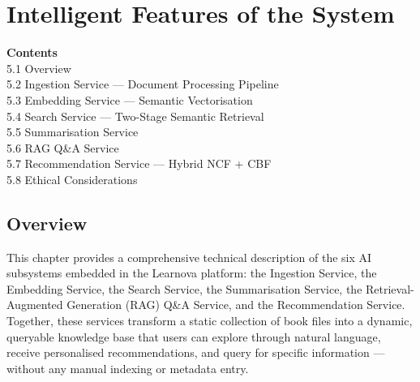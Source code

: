 \chapter{Intelligent Features of the System}

\vspace{-0.5cm}
\begin{center}
\begin{minipage}{0.85\textwidth}
\small
\textbf{Contents}\\[0.3cm]
\hspace*{1cm} 5.1 \quad Overview \dotfill \pageref{sec:ch5overview}\\
\hspace*{1cm} 5.2 \quad Ingestion Service --- Document Processing Pipeline \dotfill \pageref{sec:ingestion}\\
\hspace*{1cm} 5.3 \quad Embedding Service --- Semantic Vectorisation \dotfill \pageref{sec:embedding}\\
\hspace*{1cm} 5.4 \quad Search Service --- Two-Stage Semantic Retrieval \dotfill \pageref{sec:search}\\
\hspace*{1cm} 5.5 \quad Summarisation Service \dotfill \pageref{sec:summarisation}\\
\hspace*{1cm} 5.6 \quad RAG Q\&A Service \dotfill \pageref{sec:ragservice}\\
\hspace*{1cm} 5.7 \quad Recommendation Service --- Hybrid NCF + CBF \dotfill \pageref{sec:recommender}\\
\hspace*{1cm} 5.8 \quad Ethical Considerations \dotfill \pageref{sec:ethics}\\
\end{minipage}
\end{center}
\vspace{0.5cm}
\newpage

\section{Overview}
\label{sec:ch5overview}

This chapter provides a comprehensive technical description of the six AI
subsystems embedded in the Learnova platform: the Ingestion Service, the
Embedding Service, the Search Service, the Summarisation Service, the
Retrieval-Augmented Generation (RAG) Q\&A Service, and the Recommendation
Service. Together, these services transform a static collection of book files
into a dynamic, queryable knowledge base that users can explore through natural
language, receive personalised recommendations, and query for specific
information --- without any manual indexing or metadata entry.

